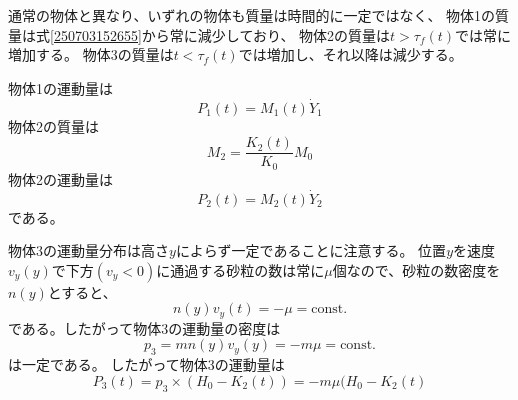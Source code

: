 \documentclass[]{article}
\begin{document}
通常の物体と異なり、いずれの物体も質量は時間的に一定ではなく、
物体1の質量は式\eqref{250703152655}から常に減少しており、
物体2の質量は$t>\tau_f(t)$では常に増加する。
物体3の質量は$t<\tau_f(t)$では増加し、それ以降は減少する。


物体1の運動量は
\begin{equation} \label{250917102959} 
   P_1(t)  = M_1(t) \dot{Y}_1 
\end{equation}
物体2の質量は
\begin{equation} \label{250917184641} 
   M_2 = \frac{K_2(t)}{K_0} M_0
\end{equation}
物体2の運動量は
\begin{equation} \label{250917103019} 
   P_2(t) = M_2(t)\dot{Y}_2  
\end{equation}
である。


物体3の運動量分布は高さ$y$によらず一定であることに注意する。
位置$y$を速度$v_y(y)$で下方$(v_y<0)$に通過する砂粒の数は常に$\mu$個なので、砂粒の数密度を$n(y)$とすると、
\begin{equation} \label{250917101402} 
   n(y) v_y(t) = -\mu = \text{const.}
\end{equation}
である。したがって物体3の運動量の密度は
\begin{equation} \label{250917102631} 
   p_3 = mn(y)v_y(y)= -m \mu = \text{const.}
\end{equation}
は一定である。
したがって物体3の運動量は
\begin{equation} \label{250917102719} 
   P_3(t) = p_3 \times (H_0 - K_2(t)) = -m\mu(H_0-K_2(t)
\end{equation}



%
%
%
\end{document}
